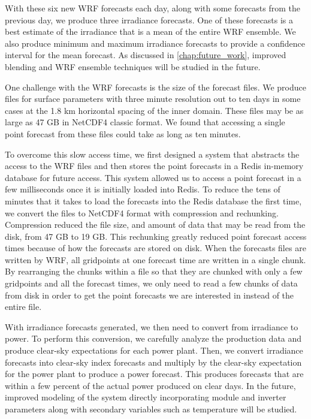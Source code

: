 With these six new WRF forecasts each day, along with some forecasts
from the previous day, we produce three irradiance forecasts.
One of these forecasts is a best estimate of the irradiance that is a
mean of the entire WRF ensemble.
We also produce minimum and maximum irradiance forecasts to provide a
confidence interval for the mean forecast.
As discussed in \cref{chap:future_work}, improved blending and WRF
ensemble techniques will be studied in the future.

One challenge with the WRF forecasts is the size of the forecast
files.
We produce files for surface parameters with three minute resolution
out to ten days in some cases at the 1.8 km horizontal spacing of the
inner domain.
These files may be as large as 47 GB in NetCDF4 classic format.
We found that accessing a single point forecast from these files could
take as long as ten minutes.

To overcome this slow access time, we first designed a system that
abstracts the access to the WRF files and then stores the point
forecasts in a Redis in-memory database for future access.
This system allowed us to access a point forecast in a few
milliseconds once it is initially loaded into Redis.
To reduce the tens of minutes that it takes to load the forecasts into
the Redis database the first time, we convert the files to NetCDF4
format with compression and rechunking.
Compression reduced the file size, and amount of data that may be read
from the disk, from 47 GB to 19 GB.
This rechunking greatly reduced point forecast access times because of
how the forecasts are stored on disk.
When the forecasts files are written by WRF, all gridpoints at one
forecast time are written in a single chunk.
By rearranging the chunks within a file so that they are chunked with
only a few gridpoints and all the forecast times, we
only need to read a few chunks of data from disk in order to get the
point forecasts we are interested in instead of the entire file.

With irradiance forecasts generated, we then need to convert from
irradiance to power.
To perform this conversion, we carefully analyze the
production data and produce clear-sky expectations for each power
plant.
Then, we convert irradiance forecasts into clear-sky index forecasts
and multiply by the clear-sky expectation for the power plant to
produce a power forecast.
This produces forecasts that are within a few percent of the actual
power produced on clear days.
In the future, improved modeling of the system directly incorporating
module and inverter parameters along with secondary variables such as
temperature will be studied.

